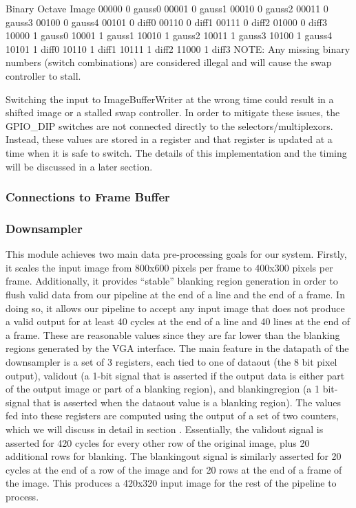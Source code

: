 \documentclass[12pt]{article}
\begin{document}
Binary	Octave	Image
00000	0	gauss0
00001	0	gauss1
00010	0	gauss2
00011	0	gauss3
00100	0	gauss4
00101	0	diff0
00110	0	diff1
00111	0	diff2
01000	0	diff3
10000	1	gauss0
10001	1	gauss1
10010	1	gauss2
10011	1	gauss3
10100	1	gauss4
10101	1	diff0
10110	1	diff1
10111	1	diff2
11000	1	diff3
NOTE: Any missing binary numbers (switch combinations) are considered illegal 
and will cause the swap controller to stall.

Switching the input to ImageBufferWriter at the wrong time could result in 
a shifted image or a stalled swap controller. In order to mitigate these issues, 
the GPIO\_DIP switches are not connected directly to the selectors/multiplexors. 
Instead, these values are stored in a register and that register is updated at 
a time when it is safe to switch. The details of this implementation and the 
timing will be discussed in a later section.

\subsubsection{Connections to Frame Buffer}


\subsubsection{Downsampler}
This module achieves two main data pre-processing goals for our system. Firstly,
it scales the input image from 800x600 pixels per frame to 400x300 pixels per frame.
Additionally, it provides ``stable'' blanking region generation in order to 
flush valid data from our pipeline at the end of a line and the end of a frame.
In doing so, it allows our pipeline to accept any input image that does not 
produce a valid output for at least 40 cycles at the end of a line and 40 lines
at the end of a frame. These are reasonable values since they are far lower than
the blanking regions generated by the VGA interface. The main feature in the
datapath of the downsampler is a set of 3 registers, each tied to one of 
dataout (the 8 bit pixel output), validout (a 1-bit signal that is asserted if
the output data is either part of the output image or part of a blanking region), 
and blankingregion (a 1 bit-signal that is asserted when the dataout value is
a blanking region). The values fed into these registers are computed using 
the output of a set of two counters, which we will discuss in detail in section 
. Essentially, the validout signal is asserted for 420 cycles for every other row 
of the original image, plus 20 additional rows for blanking. The blankingout signal
is similarly asserted for 20 cycles at the end of a row of the image and for
20 rows at the end of a frame of the image. This produces a 420x320 input image
for the rest of the pipeline to process.
\end{document}
